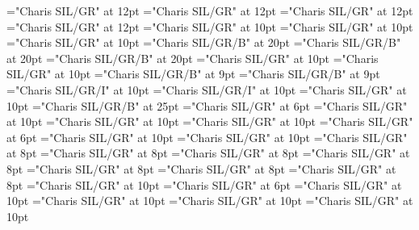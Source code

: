 \documentclass[a4paper]{article}
\begin{document}
\pagestyle{plain}
\sloppy
\setlength{\parfillskip}{0pt plus 1fil}
\font\divzxx="Charis SIL/GR" at 12pt
\font\spanzxx="Charis SIL/GR" at 12pt
\font\picturepictureRight="Charis SIL/GR" at 12pt
\font\imgpicturedivpictureLeft="Charis SIL/GR" at 12pt
\font\scrBookscrBody="Charis SIL/GR" at 10pt
\font\scrBookNamezxxscrBookscrBody="Charis SIL/GR" at 10pt
\font\scrBookCodezxxscrBookscrBody="Charis SIL/GR" at 10pt
\font\TitleMainscrBookscrBody="Charis SIL/GR/B" at 20pt
\font\spanzxxTitleMainscrBookscrBody="Charis SIL/GR/B" at 20pt
\font\TitleSecondaryzxxTitleMainscrBookscrBody="Charis SIL/GR/B" at 20pt
\font\columnsscrBookscrBody="Charis SIL/GR" at 10pt
\font\scrSectioncolumnsscrBookscrBody="Charis SIL/GR" at 10pt
\font\SectionHeadscrSectioncolumnsscrBookscrBody="Charis SIL/GR/B" at 9pt
\font\spanzxxSectionHeadscrSectioncolumnsscrBookscrBody="Charis SIL/GR/B" at 9pt
\font\ParallelPassageReferencescrSectioncolumnsscrBookscrBody="Charis SIL/GR/I" at 10pt
\font\spanzxxParallelPassageReferencescrSectioncolumnsscrBookscrBody="Charis SIL/GR/I" at 10pt
\font\ParagraphscrSectioncolumnsscrBookscrBody="Charis SIL/GR" at 10pt
\font\ChapterNumberzxxParagraphscrSectioncolumnsscrBookscrBody="Charis SIL/GR/B" at 25pt
\font\VerseNumberzxxParagraphscrSectioncolumnsscrBookscrBody="Charis SIL/GR" at 6pt
\font\spanzxxParagraphscrSectioncolumnsscrBookscrBody="Charis SIL/GR" at 10pt
\font\liscrSectioncolumnsscrBookscrBody="Charis SIL/GR" at 10pt
\font\spanzxxliscrSectioncolumnsscrBookscrBody="Charis SIL/GR" at 10pt
\font\VerseNumberzxxspanzxxliscrSectioncolumnsscrBookscrBody="Charis SIL/GR" at 6pt
\font\spanzxxspanzxxliscrSectioncolumnsscrBookscrBody="Charis SIL/GR" at 10pt
\font\scrFootnoteMarkerParagraphscrSectioncolumnsscrBookscrBody="Charis SIL/GR" at 10pt
\font\NoteCrossHYPHENReferenceParagraphParagraphscrSectioncolumnsscrBookscrBody="Charis SIL/GR" at 8pt
\font\NoteTargetReferencezxxNoteCrossHYPHENReferenceParagraphParagraphscrSectioncolumnsscrBookscrBody="Charis SIL/GR" at 8pt
\font\spanzxxNoteCrossHYPHENReferenceParagraphParagraphscrSectioncolumnsscrBookscrBody="Charis SIL/GR" at 8pt
\font\NoteGeneralParagraphParagraphscrSectioncolumnsscrBookscrBody="Charis SIL/GR" at 8pt
\font\NoteTargetReferencezxxNoteGeneralParagraphParagraphscrSectioncolumnsscrBookscrBody="Charis SIL/GR" at 8pt
\font\ReferencedTextzxxNoteGeneralParagraphParagraphscrSectioncolumnsscrBookscrBody="Charis SIL/GR" at 8pt
\font\spanzxxNoteGeneralParagraphParagraphscrSectioncolumnsscrBookscrBody="Charis SIL/GR" at 8pt
\font\LinebscrSectioncolumnsscrBookscrBody="Charis SIL/GR" at 10pt
\font\VerseNumberzxxLinebscrSectioncolumnsscrBookscrBody="Charis SIL/GR" at 6pt
\font\spanzxxLinebscrSectioncolumnsscrBookscrBody="Charis SIL/GR" at 10pt
\font\LinecscrSectioncolumnsscrBookscrBody="Charis SIL/GR" at 10pt
\font\spanzxxLinecscrSectioncolumnsscrBookscrBody="Charis SIL/GR" at 10pt
\font\rqzxxLinecscrSectioncolumnsscrBookscrBody="Charis SIL/GR" at 10pt
\end{document}
